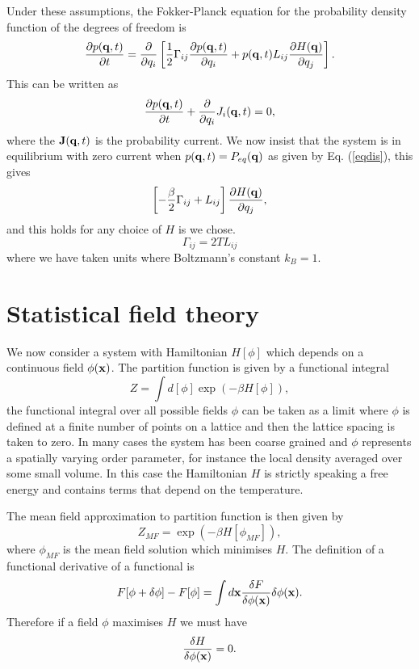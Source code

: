 Under these assumptions, the Fokker-Planck equation for the probability density function of the degrees of freedom is 
\begin{equation}
\frac{\partial p({\bf q},t)}{\partial t} = \frac{\partial}{\partial q_i} \left[\frac{1}{2}\Gamma_{ij} \frac{\partial p({\bf q},t)}{\partial q_i} + p({\bf q},t) L_{ij}\frac{\partial H({\bf q})}{ \partial q_j}\right].
\end{equation}
This can be written as 
\begin{equation}
\frac{\partial p({\bf q},t)}{\partial t} +\frac{\partial}{\partial q_i}J_i({\bf q},t)=0,
\end{equation}
where the ${\bf J}({\bf q},t)$ is the probability current. We now insist that the system is in equilibrium with zero current when $p({\bf q},t)= P_{eq}({\bf q})$ as given by Eq. (\ref{eqdis}), this gives
\begin{equation}
\left[-\frac{\beta}{2}\Gamma_{ij} + L_{ij}\right]\frac{\partial H({\bf q})}{ \partial q_j},
\end{equation}
and this holds for any choice of $H$ is we chose.
\begin{equation}
\Gamma_{ij}= 2T L_{ij}
\end{equation}
where we have taken units where Boltzmann's constant $k_B=1$. 
\section{Statistical field theory}
We now consider a system with Hamiltonian $H[\phi]$ which depends on a continuous field 
$\phi({\bf x})$. The partition function is given by a functional integral
\begin{equation}
Z = \int d[\phi] \exp(-\beta H[\phi]),
\end{equation}
the functional integral over all possible fields $\phi$ can be taken as a limit where $\phi$ is defined at a finite number of points on a lattice and then the lattice spacing is taken to zero. 
In many cases  the system has been coarse grained and $\phi$ represents a spatially varying order parameter, for instance the local density averaged over some small volume. In this case the Hamiltonian $H$ is strictly speaking a free energy  and contains terms that depend on the temperature.

The mean field approximation to partition function is then given by
\begin{equation}
Z _{MF}=  \exp(-\beta H[\phi_{MF}]),
\end{equation} 
where $\phi_{MF}$ is the mean field solution which minimises $H$. The definition of a functional derivative of a functional is
\begin{equation}
F[\phi+\delta\phi]-F[\phi]= \int d{\bf x} \frac{\delta F}{\delta\phi({\bf x})} \delta\phi({\bf x}).
\end{equation}
Therefore if a field $\phi$ maximises $H$ we must have 
\begin{equation}
\frac{\delta H}{\delta\phi({\bf x})}=0.
\end{equation}

